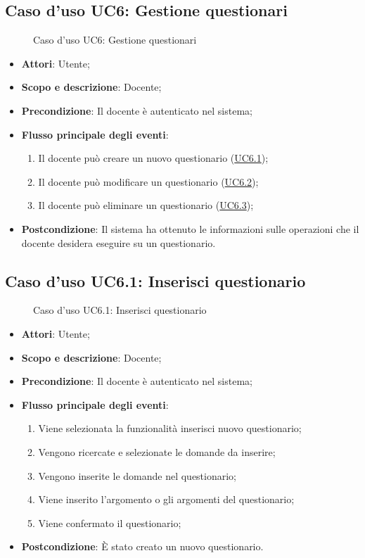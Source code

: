 \documentclass[12pt,a4paper]{article}
\begin{document}
\subsection{Caso d'uso UC6: Gestione questionari}
\begin{figure}[H]
	\centering

	\caption{Caso d'uso UC6: Gestione questionari}\label{fig:UC6} 
\end{figure}\begin{itemize}
\item \textbf{Attori}: Utente;
\item \textbf{Scopo e descrizione}: Docente; 
\item \textbf{Precondizione}: Il docente è autenticato nel sistema;

\item \textbf{Flusso principale degli eventi}:
\begin{enumerate}
	\item Il docente può creare un nuovo questionario (\hyperlink{UC6.1}{UC6.1});
	\item Il docente può modificare un questionario (\hyperlink{UC6.2}{UC6.2});
	\item Il docente può eliminare un questionario (\hyperlink{UC6.3}{UC6.3});
	
\end{enumerate}
\item \textbf{Postcondizione}: Il sistema ha ottenuto le informazioni sulle operazioni che
il docente desidera eseguire su un questionario.
\end{itemize}
\hypertarget{UC6.1}{}
\subsection{Caso d'uso UC6.1: Inserisci questionario}
\begin{figure}[H]
	\centering

	\caption{Caso d'uso UC6.1: Inserisci questionario}\label{fig:UC6.1} 
\end{figure}\begin{itemize}
\item \textbf{Attori}: Utente;
\item \textbf{Scopo e descrizione}: Docente; 
\item \textbf{Precondizione}: Il docente è autenticato nel sistema;

\item \textbf{Flusso principale degli eventi}:
\begin{enumerate}
	\item Viene selezionata la funzionalità inserisci nuovo questionario;
	\item Vengono ricercate e selezionate le domande da inserire;
	\item Vengono inserite le domande nel questionario;
	\item Viene inserito l'argomento o gli argomenti del questionario;
	\item Viene confermato il questionario;
	
\end{enumerate}
\item \textbf{Postcondizione}: È stato creato un nuovo questionario.
\end{itemize}
\hypertarget{UC6.2}{}
\end{document}
